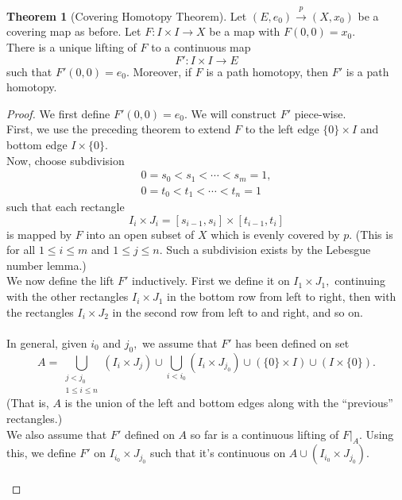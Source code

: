 \documentclass[12pt]{article}
\theoremstyle{definition}
\newtheorem{thm}{Theorem}
\numberwithin{thm}{section}
\begin{document}
\begin{thm}[Covering Homotopy Theorem]
	Let $(E, e_0) \overset{p}{\longrightarrow} (X, x_0)$ be a covering map as before. Let $F:I \times I \to X$ be a map with $F(0, 0) = x_0.$\\
	There is a unique lifting of $F$ to a continuous map
	\begin{equation*} 
		F':I \times I \to E
	\end{equation*}
	such that $F'(0, 0) = e_0.$ Moreover, if $F$ is a path homotopy, then $F'$ is a path homotopy.
\end{thm} 
\begin{proof} 
	We first define $F'(0, 0) = e_0.$ We will construct $F'$ piece-wise.\\
	First, we use the preceding theorem to extend $F$ to the left edge $\{0\} \times I$ and bottom edge $I \times \{0\}.$ \\
	Now, choose subdivision
	\begin{align*} 
		0 = s_0 < s_1 < \cdots < s_m = 1,\\
		0 = t_0 < t_1 < \cdots < t_n = 1
	\end{align*}
	such that each rectangle 
	\begin{equation*} 
		I_i \times J_i = [s_{i - 1}, s_i] \times [t_{i - 1}, t_i] 
	\end{equation*}
	is mapped by $F$ into an open subset of $X$ which is evenly covered by $p.$ (This is for all $1 \le i \le m$ and $1 \le j \le n.$ Such a subdivision exists by the Lebesgue number lemma.)\\
	We now define the lift $F'$ inductively. First we define it on $I_1 \times J_1,$ continuing with the other rectangles $I_i \times J_1$ in the bottom row from left to right, then with the rectangles $I_i \times J_2$ in the second row from left to and right, and so on.\\~\\
	In general, given $i_0$ and $j_0,$ we assume that $F'$ has been defined on set
	\begin{equation*} 
		A = \bigcup_{\substack{j < j_0\\1 \le i \le n}}(I_i \times J_j) \cup \bigcup_{i < i_0}(I_i \times J_{j_0}) \cup \left(\{0\} \times I\right) \cup \left(I \times \{0\}\right).
	\end{equation*}
	(That is, $A$ is the union of the left and bottom edges along with the ``previous'' rectangles.)\\
	We also assume that $F'$ defined on $A$ so far is a continuous lifting of $F|_A.$ Using this, we define $F'$ on $I_{i_0} \times J_{j_0}$ such that it's continuous on $A \cup (I_{i_0} \times J_{j_0}).$\\~\\

\end{proof}
\end{document}
